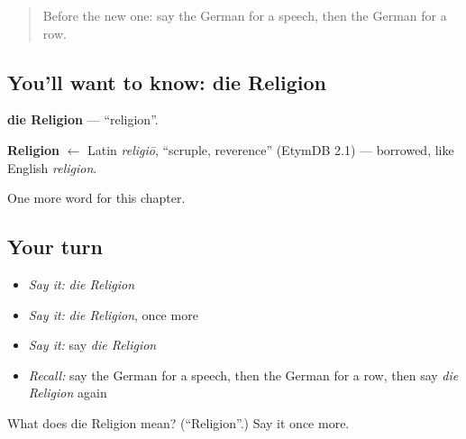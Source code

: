 \begin{quote}
Before the new one: say the German for a speech, then the German for a row.
\end{quote}

\subsection*{You'll want to know: die Religion}
\textbf{die Religion} — \textquotedblleft{}religion\textquotedblright{}.

\begin{cousinweb}
\textbf{Religion} $\leftarrow$ Latin \emph{religiō}, \textquotedblleft{}scruple, reverence\textquotedblright{} (EtymDB 2.1) — borrowed, like English \emph{religion}.
\end{cousinweb}

\begin{grammarlens}[title={What you've built}]
One more word for this chapter.
\end{grammarlens}

\subsection*{Your turn}
\begin{itemize}
\raggedright
  \item \emph{Say it:} \emph{die Religion}
  \item \emph{Say it:} \emph{die Religion}, once more
  \item \emph{Say it:} say \emph{die Religion}
  \item \emph{Recall:} say the German for a speech, then the German for a row, then say \emph{die Religion} again
\end{itemize}

\begin{tcolorbox}[breakable,colback=teal!4,colframe=teal!35!black,title={Before you move on}]
What does die Religion mean? (\textquotedblleft{}Religion\textquotedblright{}.) Say it once more.
\end{tcolorbox}
